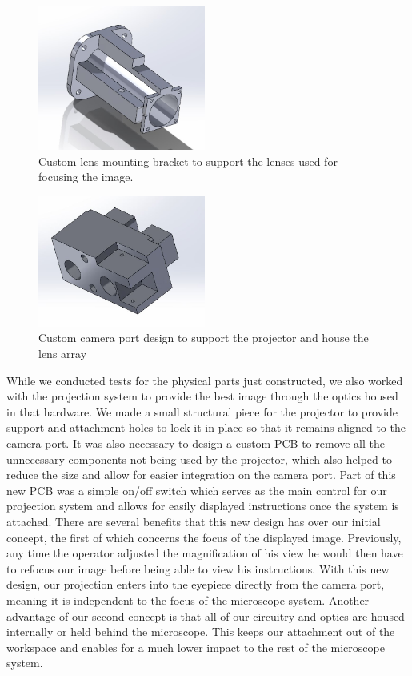 \documentclass[12pt,a4paper]{article}
\begin{document}
\begin{appendices}
\begin{figure}[h!]
	\centering
	\includegraphics[width = 0.49\textwidth]{pics/lens_housing.jpg}
	\caption[Lens Housing Model]{\centering Custom lens mounting bracket to support the lenses used for focusing the image.}
	\label{LHM}
\end{figure}
\vfill
\begin{figure}[h!]
	\centering
	\includegraphics[width = 0.49\textwidth]{pics/camera_port.jpg}
	\caption[Camera Port Model]{\centering Custom camera port design to support the projector and house the lens array}
	\label{CPM}
\end{figure}

While we conducted tests for the physical parts just constructed, we also worked with the projection system to provide the best image through the optics housed in that hardware.  We made a small structural piece for the projector to provide support and attachment holes to lock it in place so that it remains aligned to the camera port. It was also necessary to design a custom PCB to remove all the unnecessary components not being used by the projector, which also helped to reduce the size and allow for easier integration on the camera port.  Part of this new PCB was a simple on/off switch which serves as the main control for our projection system and allows for easily displayed instructions once the system is attached.
There are several benefits that this new design has over our initial concept, the first of which concerns the focus of the displayed image.  Previously, any time the operator adjusted the magnification of his view he would then have to refocus our image before being able to view his instructions.  With this new design, our projection enters into the eyepiece directly from the camera port, meaning it is independent to the focus of the microscope system. Another advantage of our second concept is that all of our circuitry and optics are housed internally or held behind the microscope.  This keeps our attachment out of the workspace and enables for a much lower impact to the rest of the microscope system.



\end{appendices}
\end{document}
